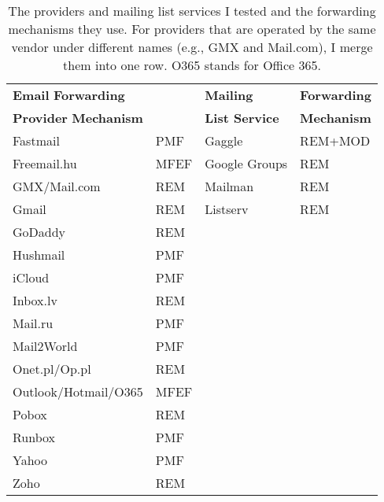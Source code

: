 \begin{table}[t]
  \centering
  \begin{tabular}{ll|ll}
  \toprule
\multicolumn{2}{l}{\textbf{Email} \hfill \hspace*{0.22in}\textbf{Forwarding}} & \textbf{Mailing} & \textbf{Forwarding} \\
\multicolumn{2}{l}{\textbf{Provider} \hfill \hspace*{0.05in}\textbf{Mechanism}} & \textbf{List Service} & \textbf{Mechanism} \\
  \midrule
  Fastmail        & PMF  & Gaggle & REM+MOD \\
  Freemail.hu     & MFEF & Google Groups & REM\\
  GMX/Mail.com    & REM  & Mailman & REM  \\
  Gmail           & REM  & Listserv & REM \\
  GoDaddy         & REM  & & \\
  Hushmail        & PMF  & & \\
  iCloud          & PMF  & & \\
  Inbox.lv        & REM  & & \\
  Mail.ru         & PMF  & & \\
  Mail2World      & PMF  & & \\
  Onet.pl/Op.pl   & REM  & & \\
  Outlook/Hotmail/O365 & MFEF & & \\
  Pobox           & REM  & & \\
  Runbox          & PMF  & & \\
  Yahoo           & PMF  & & \\
  Zoho            & REM  & & \\
  \bottomrule
  \end{tabular}
  \caption[The Providers and Mailing List Services Tested]{The providers and mailing list services I tested and the forwarding mechanisms they use. For providers that are operated by the same vendor under different names (e.g., GMX and Mail.com), I merge them into one row. O365 stands for Office 365.
    \label{tab:forwarding_mechs_in_the_wild}}
  \end{table}


